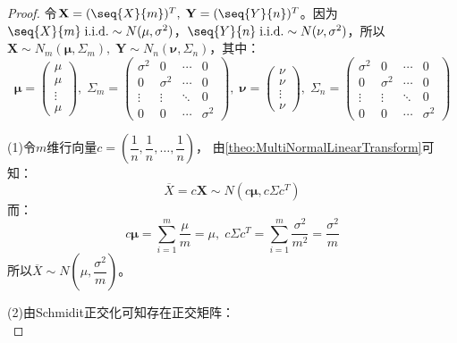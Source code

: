 \begin{proof}
	令$\mathbf{X}=(\seq{X}{m})^T,\;\mathbf{Y}=(\seq{Y}{n})^T$。因为$\seq{X}{m}\;\text{i.i.d.}\sim N(\mu,\sigma^2)$，$\seq{Y}{n}\;\text{i.i.d.}\sim N(\nu,\sigma^2)$，所以$\mathbf{X}\sim N_m(\boldsymbol{\mu},\Sigma_m),\;\mathbf{Y}\sim N_n(\boldsymbol{\nu},\Sigma_n)$，其中：
	\begin{equation*}
		\boldsymbol{\mu}=
		\begin{pmatrix}
			\mu \\
			\mu \\
			\vdots \\
			\mu
		\end{pmatrix},\;
		\Sigma_m=
		\begin{pmatrix}
			\sigma^2 & 0 & \cdots & 0 \\
			0 & \sigma^2 & \cdots & 0 \\
			\vdots & \vdots & \ddots & 0 \\
			0 & 0 & \cdots & \sigma^2
		\end{pmatrix},\;
			\boldsymbol{\nu}=
		\begin{pmatrix}
			\nu \\
			\nu \\
			\vdots \\
			\nu
		\end{pmatrix},\;
		\Sigma_n=
		\begin{pmatrix}
			\sigma^2 & 0 & \cdots & 0 \\
			0 & \sigma^2 & \cdots & 0 \\
			\vdots & \vdots & \ddots & 0 \\
			0 & 0 & \cdots & \sigma^2
		\end{pmatrix}
	\end{equation*}
	\par
	(1)令$m$维行向量$c=\left(\dfrac{1}{n},\dfrac{1}{n},\dots,\dfrac{1}{n}\right)$，
	由\cref{theo:MultiNormalLinearTransform}可知：
	\begin{equation*}
		\overline{X}=c\mathbf{X}\sim N(c\boldsymbol{\mu},c\Sigma c^T)
	\end{equation*}
	而：
	\begin{equation*}
		c\boldsymbol{\mu}=\sum_{i=1}^{m}\frac{\mu}{m}=\mu,\;c\Sigma c^T=\sum_{i=1}^{m}\frac{\sigma^2}{m^2}=\frac{\sigma^2}{m}
	\end{equation*}
	所以$\overline{X}\sim N\left(\mu,\dfrac{\sigma^2}{m}\right)$。\par
	(2)由Schmidit正交化可知存在正交矩阵：
	\begin{equation*}

\end{equation*}
\end{proof}
